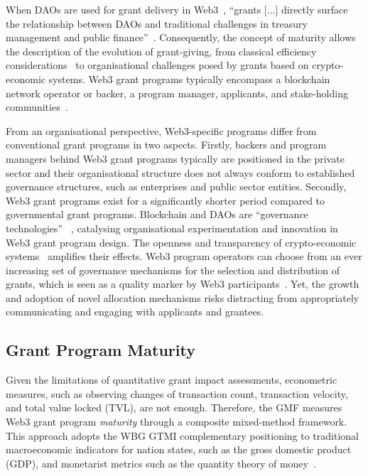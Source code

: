 \documentclass[conference]{IEEEtran}
\begin{document}
When DAOs are used for grant delivery in Web3~\cite{austgen_dao_2023},  ``grants [...] directly surface the relationship between DAOs and traditional challenges in treasury management and public finance''~\cite[p.~27]{tan_open_2023}. Consequently, the concept of maturity allows the description of the evolution of grant-giving, from classical efficiency considerations~\cite{holmstrom_agency_1989} to organisational challenges posed by grants based on crypto-economic systems. Web3 grant programs typically encompass a blockchain network operator or backer, a program manager, applicants, and stake-holding communities~\cite{gilbert_sustainable_2019,howell_financing_2017}.

From an organisational perspective, Web3-specific programs differ from conventional grant programs in two aspects. Firstly, backers and program managers behind Web3 grant programs typically are positioned in the private sector and their organisational structure does not always conform to established governance structures, such as enterprises and public sector entities. Secondly, Web3 grant programs exist for a significantly shorter period compared to governmental grant programs. Blockchain and DAOs are ``governance technologies''~\cite{brekke_hacker-engineers_2021,shermin_disrupting_2017} , catalysing organisational experimentation and innovation in Web3 grant program design.
The openness and transparency of crypto-economic systems~\cite[p.~54]{santos_dao_2018} amplifies their effects. Web3 program operators can choose from an ever increasing set of governance mechanisms for the selection and distribution of grants, which is seen as a quality marker by Web3 participants~\cite{owocki_gitcoin_2024}. Yet, the growth and adoption of novel allocation mechanisms risks distracting from appropriately communicating and engaging with applicants and grantees.

\subsection{Grant Program Maturity}\label{sec_2.2}

Given the limitations of quantitative grant impact assessments, econometric measures, such as observing changes of transaction count, transaction velocity, and total value locked (TVL), are not enough. Therefore, the GMF measures Web3 grant program \textit{maturity} through a composite mixed-method framework. This approach adopts the WBG GTMI complementary positioning to traditional macroeconomic indicators for nation states, such as the gross domestic product (GDP), and monetarist metrics such as the quantity theory of money~\cite{sun_understanding_2004}.
\end{document}
